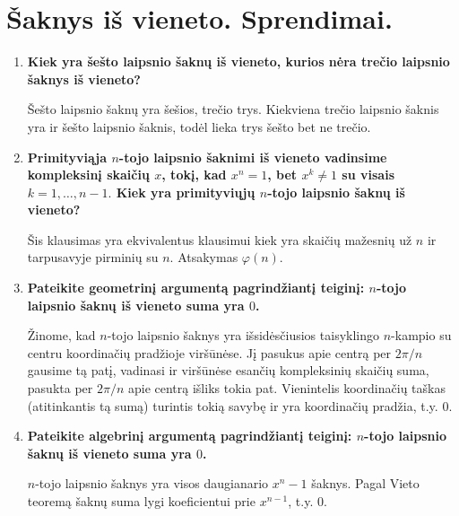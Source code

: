 

\section{Šaknys iš vieneto. Sprendimai.}

\begin{enumerate}

\item {\bf Kiek yra šešto laipsnio šaknų iš vieneto, kurios nėra trečio laipsnio šaknys iš vieneto?}\medskip

Šešto laipsnio šaknų yra šešios, trečio trys. Kiekviena trečio laipsnio šaknis yra ir šešto laipsnio šaknis, todėl lieka trys šešto bet ne trečio.
\medskip
\item {\bf Primityviąja $n$-tojo laipsnio šaknimi iš vieneto vadinsime kompleksinį skaičių $x$, tokį, kad $x^n = 1$, bet $x^k \neq 1$ su visais $k=1,\dots,n-1.$ Kiek yra primityviųjų $n$-tojo laipsnio šaknų iš vieneto?}

\medskip

Šis klausimas yra ekvivalentus klausimui kiek yra skaičių mažesnių už $n$ ir tarpusavyje pirminių su $n$. Atsakymas $\varphi(n)$.

\medskip

\item {\bf Pateikite geometrinį argumentą pagrindžiantį teiginį: $n$-tojo laipsnio šaknų iš vieneto suma yra $0$.}

\medskip

Žinome, kad $n$-tojo laipsnio šaknys yra išsidėsčiusios taisyklingo $n$-kampio su centru koordinačių pradžioje viršūnėse. Jį pasukus apie centrą per $2\pi/n$ gausime tą patį, vadinasi ir viršūnėse esančių kompleksinių skaičių suma, pasukta per $2\pi/n$ apie centrą išliks tokia pat. Vienintelis koordinačių taškas (atitinkantis tą sumą) turintis tokią savybę ir yra koordinačių pradžia, t.y. $0$.  

\medskip

\item {\bf Pateikite algebrinį argumentą pagrindžiantį teiginį: $n$-tojo laipsnio šaknų iš vieneto suma yra $0$.}

\medskip
$n$-tojo laipsnio šaknys yra visos daugianario $x^n - 1$ šaknys. Pagal Vieto teoremą šaknų suma lygi koeficientui prie $x^{n-1}$, t.y. $0$.


\end{enumerate}
